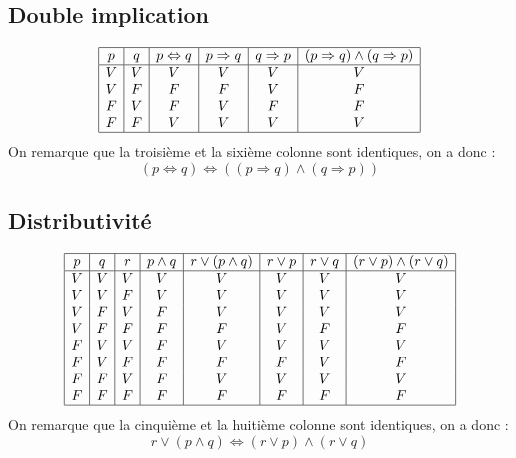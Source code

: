 \documentclass[../main.tex]{subfiles}
\begin{document}
\subsection{Double implication}
\begin{displaymath}
    \begin{array}{|c|c|c|c|c|c|}
    \hline
    p & q & p \Leftrightarrow q & p \Rightarrow q & q \Rightarrow p & (p\Rightarrow q)\land(q\Rightarrow p)\\ %
    \hline %
    V & V & V & V & V & V\\
    V & F & F & F & V & F\\
    F & V & F & V & F & F\\
    F & F & V & V & V & V\\
    \hline
    \end{array}
\end{displaymath}
On remarque que la troisième et la sixième colonne sont identiques, on a donc :
$$(p\Leftrightarrow q) \iff ((p\Rightarrow q)\land (q \Rightarrow p))$$

\subsection{Distributivité}
\begin{displaymath}
    \begin{array}{|c|c|c|c|c|c|c|c|}
    \hline
    p & q & r & p \land q & r \lor (p \land q) & r\lor p & r \lor q & (r\lor p) \land (r \lor q)\\ %
    \hline %
    V & V & V & V & V & V & V & V\\
    V & V & F & V & V & V & V & V\\
    V & F & V & F & V & V & V & V\\
    V & F & F & F & F & V & F & F\\
    F & V & V & F & V & V & V & V\\
    F & V & F & F & F & F & V & F\\
    F & F & V & F & V & V & V & V\\
    F & F & F & F & F & F & F & F\\
    \hline
    \end{array}
\end{displaymath}
On remarque que la cinquième et la huitième colonne sont identiques, on a donc :
$$r\lor (p \land q) \iff (r\lor p)\land (r\lor q)$$
\end{document}

